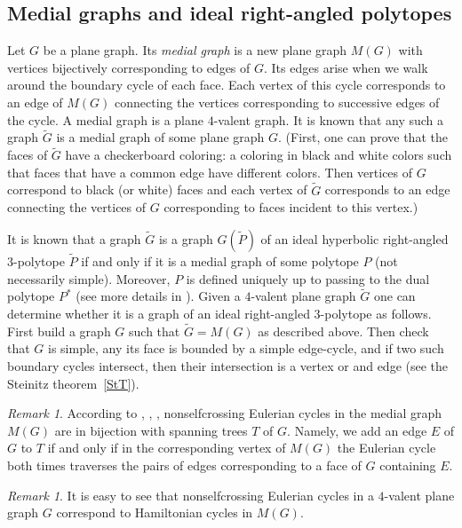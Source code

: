 \documentclass[12pt]{amsart}
\theoremstyle{definition}
\theoremstyle{remark}
\newtheorem{remark}[formula]{Remark}
\begin{document}
\subsection{Medial graphs and ideal right-angled polytopes} 
Let $G$  be a plane graph. 
Its {\it medial graph} is a new plane graph $M(G)$ with vertices bijectively corresponding to edges of $G$. 
Its edges arise when we walk around the boundary cycle of each face. Each vertex of this cycle corresponds
to an edge of $M(G)$ connecting the vertices corresponding to successive edges of the cycle. A medial graph is a plane $4$-valent
graph. It is known that any such a graph $\widetilde{G}$ is a medial graph of some plane graph $G$. 
(First, one can prove that the faces of $\widetilde{G}$ have a checkerboard coloring: a coloring in black and white colors
such that faces that have a common edge have different colors. Then vertices of $G$ correspond to black (or white) faces
and  each vertex of $\widetilde{G}$ corresponds to an edge connecting the vertices of $G$ corresponding to faces incident to this vertex.)

It is known that a graph $\widetilde{G}$ is a graph $G(\widetilde{P})$ of an ideal hyperbolic right-angled $3$-polytope  
$\widetilde{P}$ if and only if 
it is a medial graph of some polytope $P$ (not necessarily simple). Moreover, $P$ 
is defined uniquely up to passing to the dual polytope $P^*$ (see more details in \cite[Section 9]{E19}). Given a $4$-valent 
plane graph $\widetilde{G}$ one can determine whether it is a graph of an ideal right-angled $3$-polytope as follows. 
First build a graph $G$ such that $\widetilde{G}=M(G)$ as described above. Then check that $G$ is  
simple, any its face is bounded by a simple edge-cycle, and if two such boundary cycles  intersect, then their intersection is a 
vertex or and edge (see the Steinitz theorem~\ref{StT}).
\begin{remark}
According to \cite[Theorem 14]{K68b}, \cite{L78}, \cite[Corollary 3.5]{B87}, 
nonselfcrossing Eulerian cycles in the medial graph $M(G)$ are in bijection with spanning
trees $T$ of $G$. Namely, we add an edge $E$ of $G$ to $T$ if and only if in the corresponding vertex 
of $M(G)$ the Eulerian cycle both times traverses the pairs of edges corresponding to a face of $G$ containing $E$.
\end{remark}
\begin{remark}
It is easy to see that nonselfcrossing Eulerian cycles in a $4$-valent plane graph $G$ correspond to Hamiltonian cycles in $M(G)$.
\end{remark}
\end{document}
